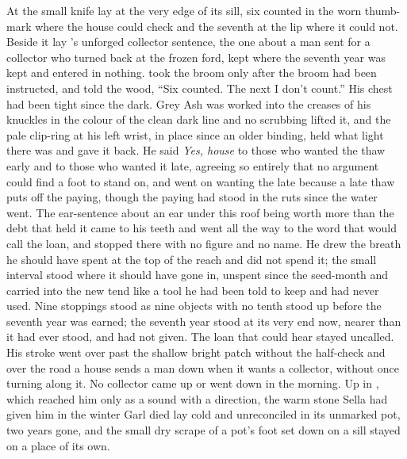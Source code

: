 At  the small knife lay at the very edge of its sill, six counted in the worn thumb-mark where the house could check and the seventh at the lip where it could not. Beside it lay 's unforged collector sentence, the one about a man sent for a collector who turned back at the frozen ford, kept where the seventh year was kept and entered in nothing.  took the broom only after the broom had been instructed, and told the wood, “Six counted. The next I don't count.” His chest had been tight since the dark. Grey Ash was worked into the creases of his knuckles in the colour of the clean dark line and no scrubbing lifted it, and the pale clip-ring at his left wrist, in place since an older binding, held what light there was and gave it back. He said \emph{Yes, house} to those who wanted the thaw early and to those who wanted it late, agreeing so entirely that no argument could find a foot to stand on, and went on wanting the late because a late thaw puts off the paying, though the paying had stood in the ruts since the water went. The ear-sentence about an ear under this roof being worth more than the debt that held it came to his teeth and went all the way to the word that would call the loan, and stopped there with no figure and no name. He drew the breath he should have spent at the top of the reach and did not spend it; the small interval stood where it should have gone in, unspent since the seed-month and carried into the new tend like a tool he had been told to keep and had never used. Nine stoppings stood as nine objects with no tenth stood up before the seventh year was earned; the seventh year stood at its very end now, nearer than it had ever stood, and had not given. The loan that could hear stayed uncalled. His stroke went over  past the shallow bright patch without the half-check and over the road a house sends a man down when it wants a collector, without once turning along it. No collector came up or went down  in the morning. Up in , which reached him only as a sound with a direction, the warm stone Sella had given him in the winter Garl died lay cold and unreconciled in its unmarked pot, two years gone, and the small dry scrape of a pot's foot set down on a sill stayed on a place of its own.

